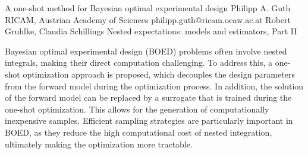 \begin{talk}
  {A one-shot method for Bayesian optimal experimental design}%
  {Philipp A. Guth}%
  {RICAM, Austrian Academy of Sciences}%
  {philipp.guth@ricam.oeaw.ac.at}%
  {Robert Gruhlke, Claudia Schillings}%
  {Nested expectations: models and estimators, Part II}%
    
  
Bayesian optimal experimental design (BOED) problems often involve nested integrals, making their direct computation challenging. To address this, a one-shot optimization approach is proposed, which decouples the design parameters from the forward model during the optimization process. In addition, the solution of the forward model can be replaced by a surrogate that is trained during the one-shot optimization. This allows for the generation of computationally inexpensive samples. Efficient sampling strategies are particularly important in BOED, as they reduce the high computational cost of nested integration, ultimately making the optimization more tractable.



%
%
\end{talk}

